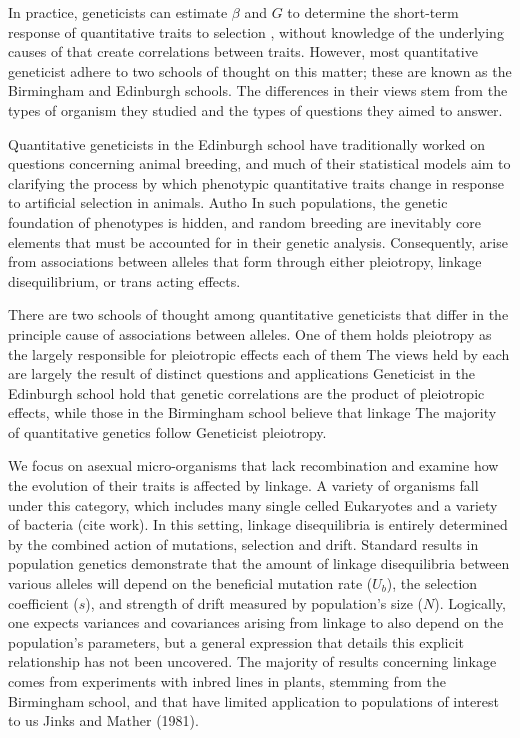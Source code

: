 \documentclass[11pt,one column]{article}
\begin{document}
\begin{multicols}{2}
In practice, geneticists can estimate $\beta$ and $G$ to determine the short-term response of quantitative traits to selection \cite{lynch1998genetics}, without knowledge of the underlying causes of that create correlations between traits.  However, most quantitative geneticist adhere to two schools of thought on this matter; these are known as the Birmingham and Edinburgh schools.  The differences in their views stem from the types of organism they studied and the types of questions they aimed to answer.\par

Quantitative geneticists in the Edinburgh school have traditionally worked on questions concerning animal breeding, and much of their statistical models aim to clarifying the process by which phenotypic quantitative traits change in response to artificial selection in animals.  Autho
In such populations, the genetic foundation of phenotypes is hidden, and random breeding are inevitably core elements that must be accounted for in their genetic analysis.  Consequently, arise from associations between alleles that form through either pleiotropy, linkage disequilibrium, or trans acting effects.\par

There are two schools of thought among quantitative geneticists that differ in the principle cause of associations between alleles.  One of them holds pleiotropy as the largely responsible for  pleiotropic effects each of them The views held by each are largely the result of distinct questions and applications Geneticist in the Edinburgh school hold that genetic correlations are the product of pleiotropic effects, while those in the Birmingham school believe that linkage The majority of quantitative genetics follow Geneticist pleiotropy.\par

We focus on asexual micro-organisms that lack recombination and examine how the evolution of their traits is affected by linkage. A variety of organisms fall under this category, which includes many single celled Eukaryotes and a variety of bacteria (cite work). In this setting, linkage disequilibria is entirely determined by the combined action of mutations, selection and drift. Standard results in population genetics demonstrate that the amount of linkage disequilibria between various alleles will depend on the beneficial mutation rate ($U_b$), the selection coefficient ($s$), and strength of drift measured by population’s size ($N$). Logically, one expects variances and covariances arising from linkage to also depend on the population’s parameters, but a general expression that details this explicit relationship has not been uncovered. The majority of results concerning linkage comes from experiments with inbred lines in plants, stemming from the Birmingham school, and that have limited application to populations of interest to us Jinks and Mather (1981).\par


\end{multicols}
\end{document}
